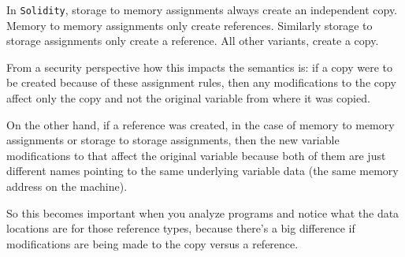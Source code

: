 In \texttt{Solidity}, storage to memory assignments always create an
independent copy. Memory to memory assignments only create references.
Similarly storage to storage assignments only create a reference. All
other variants, create a copy.

From a security perspective how this impacts the semantics is: if a copy
were to be created because of these assignment rules, then any
modifications to the copy affect only the copy and not the original
variable from where it was copied.

On the other hand, if a reference was created, in the case of memory to
memory assignments or storage to storage assignments, then the new
variable modifications to that affect the original variable because both
of them are just different names pointing to the same underlying
variable data (the same memory address on the machine).

So this becomes important when you analyze programs and notice what the
data locations are for those reference types, because there's a big
difference if modifications are being made to the copy versus a
reference.
